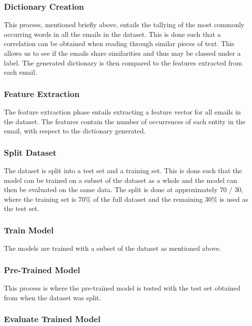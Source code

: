 \documentclass[11pt, a4paper]{article}
\begin{document}
\subsubsection*{Dictionary Creation}

This process, mentioned briefly above, entails the tallying of the most commonly occurring words in all the emails in the dataset. This is done such that a correlation can be obtained when reading through similar pieces of text. This allows us to see if the emails share similarities and thus may be classed under a label. The generated dictionary is then compared to the features extracted from each email.

\subsubsection*{Feature Extraction}

The feature extraction phase entails extracting a feature vector for all emails in the dataset. The features contain the number of occurrences of each entity in the email, with respect to the dictionary generated.  

\subsubsection*{Split Dataset}

The dataset is split into a test set and a training set. This is done such that the model can be trained on a subset of the dataset as a whole and the model can then be evaluated on the same data. The split is done at approximately 70 / 30, where the training set is 70\% of the full dataset and the remaining 30\% is used as the test set.

\subsubsection*{Train Model}

The models are trained with a subset of the dataset as mentioned above. 

\subsubsection*{Pre-Trained Model}

This process is where the pre-trained model is tested with the test set obtained from when the dataset was split.

\subsubsection*{Evaluate Trained Model}
\end{document}
